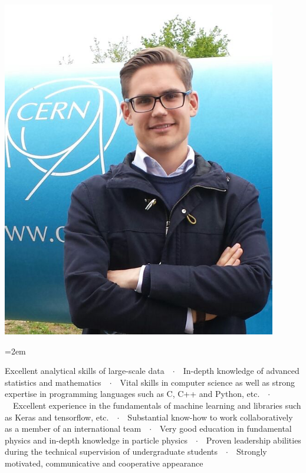 \documentclass[xcolor=dvipsnames]{scrartcl}
\newcommand{\Description}[1]{\hangindent=2em\hangafter=0\noindent\raggedright\footnotesize{#1}\par\normalsize\vspace{1em}} %
\begin{document}
\begin{cv}{}
\begin{minipage}{0.7\textwidth}
\end{minipage}
\begin{minipage}{0.25\textwidth}%
  \includegraphics[width=0.9\textwidth]{dhandl.png}
\end{minipage}


\vspace{1em} %

\noindent{}\vspace{1em} %

\Description{Excellent analytical skills of large-scale data\ \ $\cdotp$\ \ In-depth knowledge of advanced statistics and mathematics\ \ $\cdotp$\ \ Vital skills in computer science as well as strong expertise in programming languages such as C, C++ and Python, etc.\ \ $\cdotp$\ \ Excellent experience in the fundamentals of machine learning and libraries such as Keras and tensorflow, etc.\ \ $\cdotp$\ \ Substantial know-how to work collaboratively as a member of an international team\ \ $\cdotp$\ \ Very good education in fundamental physics and in-depth knowledge in particle physics\ \ $\cdotp$\ \ Proven leadership abilities during the technical supervision of undergraduate students\ \ $\cdotp$\ \ Strongly motivated, communicative and cooperative appearance}\vspace{1em} %


\end{cv}
\end{document}
